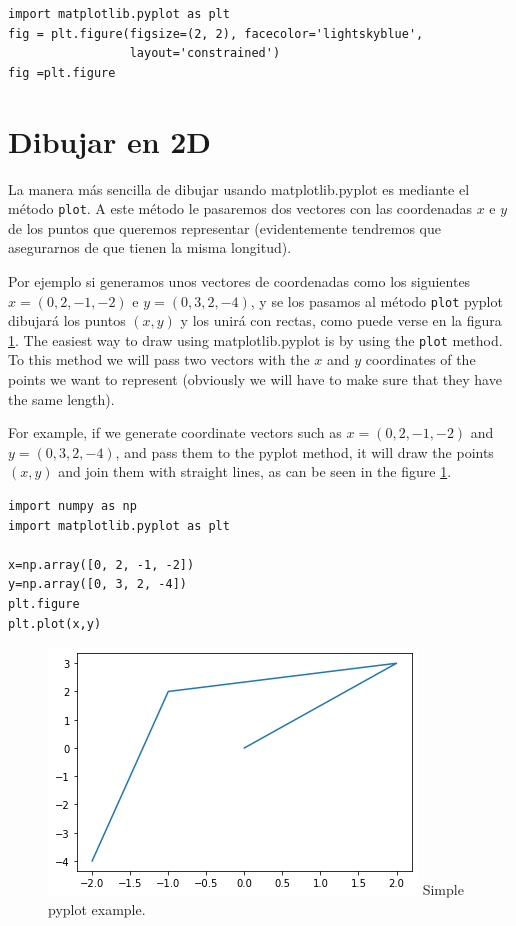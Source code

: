 \begin{paracol}{2}

\end{paracol}
\begin{verbatim}
import matplotlib.pyplot as plt
fig = plt.figure(figsize=(2, 2), facecolor='lightskyblue',
                 layout='constrained')
fig =plt.figure            
\end{verbatim}

\section{Dibujar en 2D}
\begin{paracol}{2}
    La manera más sencilla de dibujar usando matplotlib.pyplot es mediante el método \texttt{plot}. A este método le pasaremos dos vectores con las coordenadas $x$ e $y$ de los puntos que queremos representar (evidentemente tendremos que asegurarnos de que tienen la misma longitud).

    Por ejemplo si generamos unos vectores de coordenadas como los siguientes $x=(0,2,-1,-2)$ e $y=(0,3,2,-4)$, y se los pasamos al método \texttt{plot} pyplot dibujará los puntos $(x,y)$ y los unirá con rectas, como puede verse en la figura \ref{fig:pyplot-simple}.
    \switchcolumn
        The easiest way to draw using matplotlib.pyplot is by using the \texttt{plot} method. To this method we will pass two vectors with the $x$ and $y$ coordinates of the points we want to represent (obviously we will have to make sure that they have the same length).  

            For example, if we generate coordinate vectors such as $x=(0,2,-1,-2)$ and $y=(0,3,2,-4)$, and pass them to the pyplot method, it will draw the points $(x,y)$ and join them with straight lines, as can be seen in the figure \ref{fig:pyplot-simple}.
        
\end{paracol}
\begin{verbatim}
import numpy as np
import matplotlib.pyplot as plt

x=np.array([0, 2, -1, -2])
y=np.array([0, 3, 2, -4])
plt.figure
plt.plot(x,y)
\end{verbatim}
\begin{figure}[h]
    \centering
    \includegraphics[width=0.5\linewidth]{figuras/pyplot01.png}
     {Simple pyplot example.}
    \label{fig:pyplot-simple}
\end{figure}

